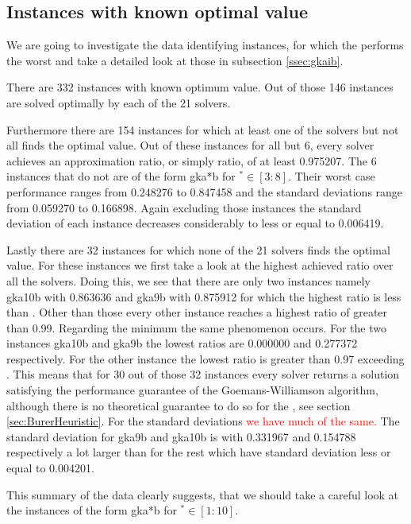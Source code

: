 \documentclass[12pt,a4paper]{article}
\theoremstyle{mythm}
\begin{document}
\subsection{Instances with known optimal value} 
\label{ssec:knownOptVal} 
We are going to investigate the data identifying instances, for which the \BH performs the worst and take a detailed look at those in subsection \ref{ssec:gkaib}.

There are 332 instances with known optimum value.
Out of those 146 instances are solved optimally by each of the 21 solvers. 

Furthermore there are 154 instances for which at least one of the solvers but not all finds the optimal value.
Out of these instances for all but 6, every solver achieves an approximation ratio, or simply ratio, of at least 0.975207.
The 6 instances that do not are of the form gka*b for $ ^{ * } \in \left[ 3:8 \right]   $. Their worst case performance ranges from 0.248276 to 0.847458 and the standard
deviations range from 0.059270 to 0.166898.
Again excluding those instances the standard deviation of each instance decreases considerably to less or equal to 0.006419.

Lastly there are 32 instances for which none of the 21 solvers finds the optimal value.
For these instances we first take a look at the highest achieved ratio over all the solvers.
Doing this, we see that there are only two instances namely gka10b with 0.863636 and gka9b with 0.875912 for which the highest ratio is less than \GWconst.
Other than those every other instance reaches a highest ratio of greater than 0.99.
Regarding the minimum the same phenomenon occurs.
For the two instances gka10b and gka9b the lowest ratios are 0.000000 and 0.277372 respectively.
For the other instance the lowest ratio is greater than 0.97 exceeding \GWconst.
This means that for 30 out of those 32 instances every solver returns a solution satisfying the performance guarantee of the Goemans-Williamson algorithm, although there is no
theoretical guarantee to do so for the \BH, see section \ref{sec:BurerHeuristic}.
For the standard deviations \textcolor{red}{we have much of the same.}
The standard deviation for gka9b and gka10b is with 0.331967 and 0.154788 respectively a lot larger than for the rest which have standard deviation less or equal
to 0.004201.

This summary of the data clearly suggests, that we should take a careful look at the instances of the form gka*b for $ ^{ * } \in \left[ 1:10 \right]   $. 
\end{document}
